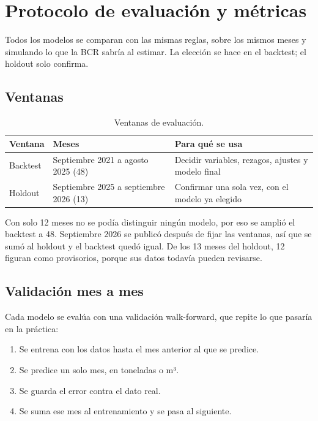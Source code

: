 \documentclass[11pt,a4paper]{article}
\begin{document}
\section{Protocolo de evaluación y métricas}\label{sec:protocolo}

Todos los modelos se comparan con las mismas reglas, sobre los mismos meses y simulando lo que la BCR sabría al estimar. La elección se hace en el backtest; el holdout solo confirma.

\subsection{Ventanas}

\begin{table}[htbp]
\centering\small
\begin{tabularx}{\textwidth}{@{}P{2cm}P{5.6cm}L@{}}
\toprule
\textbf{Ventana} & \textbf{Meses} & \textbf{Para qué se usa}\\
\midrule
Backtest & Septiembre 2021 a agosto 2025 (48) & Decidir variables, rezagos, ajustes y modelo final\\
Holdout & Septiembre 2025 a septiembre 2026 (13) & Confirmar una sola vez, con el modelo ya elegido\\
\bottomrule
\end{tabularx}
\caption{Ventanas de evaluación.}
\end{table}

Con solo 12 meses no se podía distinguir ningún modelo, por eso se amplió el backtest a 48. Septiembre 2026 se publicó después de fijar las ventanas, así que se sumó al holdout y el backtest quedó igual. De los 13 meses del holdout, 12 figuran como provisorios, porque sus datos todavía pueden revisarse.

\subsection{Validación mes a mes}

Cada modelo se evalúa con una validación walk-forward, que repite lo que pasaría en la práctica:

\begin{enumerate}
  \item Se entrena con los datos hasta el mes anterior al que se predice.
  \item Se predice un solo mes, en toneladas o m³.
  \item Se guarda el error contra el dato real.
  \item Se suma ese mes al entrenamiento y se pasa al siguiente.
\end{enumerate}
\end{document}
